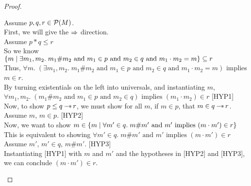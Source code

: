 \begin{proof}
\begin{enumerate}
  \begin{tabbedproof}
    Assume $p, q, r \in \mathcal{P}(M)$. \\
    \oo First, we will give the $\Rightarrow$ direction. \\
    \oo Assume $p * q \leq r$ \\
    \oo So we know 
          $\{{{m}\;|\;{\exists m_1, m_2.\; m_1 \# m_2 \mbox{ and } m_1 \in p \mbox{ and } m_2 \in q 
                                             \mbox{ and } m_1 \cdot m_2 = m}}\}
           \subseteq r$ \\
    \oo Thus, $\forall m.\; (\exists m_1, m_2.\; m_1 \# m_2 \mbox{ and } m_1 \in p \mbox{ and } m_2 \in q 
                                             \mbox{ and } m_1 \cdot m_2 = m)$ implies $m \in r$. \\
    \oo By turning existentials on the left into universals, and instantiating $m$, \\
    \ooo
             $\forall m_1, m_2.\; (m_1 \# m_2 \mbox{ and } m_1 \in p \mbox{ and } m_2 \in q) \mbox{ implies } (m_1 \cdot m_2) \in r$ [HYP1] \\
    \oo Now, to show $p \leq q -\!\!*\, r$, we must show
         for all $m$, if $m \in p$, that $m \in q -\!\!*\, r$. \\
    \oo Assume $m$, $m \in p$. [HYP2] \\
    \ooo Now, we want to show $m \in \{{{m}\;|\;{\forall m' \in q.\; m\# m' \mbox{ and } m' \mbox{ implies } (m \cdot m') \in r}}\}$ \\
    \ooo This is equivalent to showing $\forall m' \in q.\; m\# m' \mbox{ and } m' \mbox{ implies } (m \cdot m') \in r$ \\
    \ooo Assume $m'$, $m' \in q$, $m \# m'$. [HYP3] \\ 
    \oooo Instantiating [HYP1] with $m$ and $m'$ and the hypotheses in [HYP2] and [HYP3], \\
    \oooo we can conclude $(m \cdot m') \in r$.  \\[1em]


\end{tabbedproof}
\end{enumerate}
\end{proof}
